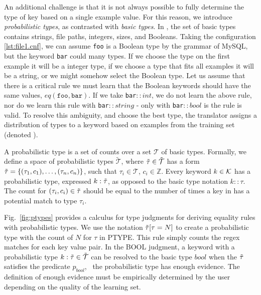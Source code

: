 An additional challenge is that it is not always possible to fully determine the type of key based on a single example value. 
For this reason, we introduce \textit{probabilistic types}, as contrasted with \textit{basic types}.
In \app, the set of basic types contains strings, file paths, integers, sizes, and Booleans. 
Taking the configuration \ref{lst:file1.cnf}, we can assume {\tt foo} is a Boolean type by the grammar of MySQL,
  but the keyword {\tt bar} could many types.
If we choose the type on the first example it will be a integer type, if we choose a type that fits all examples it will be a string, or we might somehow select the Boolean type.
Let us assume that there is a critical rule we must learn that the Boolean keywords should have the same values, $eq(\texttt{foo},\texttt{bar})$.
If we take {\tt bar}$::int$, we do not learn the above rule, nor do we learn this rule with {\tt bar}$::string$ - only with {\tt bar}$::bool$ is the rule is valid.
To resolve this ambiguity, and choose the best type, the translator assigns a distribution of types to a keyword based on examples from the training set (denoted \trainingSet).

A probabilistic type is a set of counts over a set $\mathcal{T}$ of basic types.
Formally, we define a space of probabilistic types $\tilde{\mathcal{T}}$, where $\tilde{\tau} \in \tilde{\mathcal{T}}$ has a form $\tilde{\tau}=\{(\tau_1, c_1),\ldots,(\tau_n, c_n)\}$, such that $\tau_i \in \mathcal{T}$, $c_i \in \mathbb{Z}$. 
Every keyword $k \in \mathcal{K}$ has a probabilistic type, expressed $k:\tilde{\tau}$, as opposed to the basic type notation $k::\tau$.
The count for $(\tau_i,c_i) \in \tilde{\tau}$ should be equal to the number of times a key in \trainingSet has a potential match to type $\tau_i$.

Fig.~\ref{fig:ptypes} provides a calculus for type judgments for deriving equality rules with probabilistic types.
We use the notation $\tilde{\tau}[\tau=N]$ to create a probabilistic type with the count of $N$ for $\tau$ in {\scriptsize PTYPE}.
This rule simply counts the regex matches for each key value pair.
In the {\scriptsize BOOL} judgment, a keyword with a probabilistic type $k : \tilde{\tau} \in \tilde{\mathcal{T}}$ can be resolved to the basic type $bool$ when the $\tilde{\tau}$ satisfies the predicate $p_{bool}$, \ie\ the probabilistic type has enough evidence.
The definition of enough evidence must be empirically determined by the user depending on the quality of the learning set.

